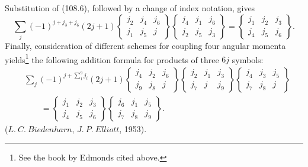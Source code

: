 Substitution of (108.6), followed by a change of index notation, gives
\begin{equation}
\sum_j(-1)^{j+j_3+j_6}(2j+1)
\left\{\begin{matrix}j_2&j_4&j_6\\j_1&j_5&j\end{matrix}\right\}
\left\{\begin{matrix}j_4&j_1&j_6\\j_2&j_5&j_3\end{matrix}\right\}
=\left\{\begin{matrix}j_1&j_2&j_3\\j_4&j_5&j_6\end{matrix}\right\}.
\tag{108.8}
\end{equation}
Finally, consideration of different schemes for coupling four angular momenta yields\footnote{See the book by Edmonds cited above.} the following addition formula for products of three $6j$ symbols:
\begin{equation}
\begin{aligned}
&\sum_j(-1)^{j+\sum_{1}^{9}j_i}(2j+1)
\left\{\begin{matrix}j_4&j_2&j_6\\j_9&j_8&j\end{matrix}\right\}
\left\{\begin{matrix}j_2&j_1&j_3\\j_7&j&j_9\end{matrix}\right\}
\left\{\begin{matrix}j_4&j_3&j_5\\j_7&j_8&j\end{matrix}\right\}\\
&\qquad=\left\{\begin{matrix}j_1&j_2&j_3\\j_4&j_5&j_6\end{matrix}\right\}
\left\{\begin{matrix}j_6&j_1&j_5\\j_7&j_8&j_9\end{matrix}\right\}.
\end{aligned}
\tag{108.9}
\end{equation}
($L.\ C.\ Biedenharn$, $J.\ P.\ Elliott$, 1953).

